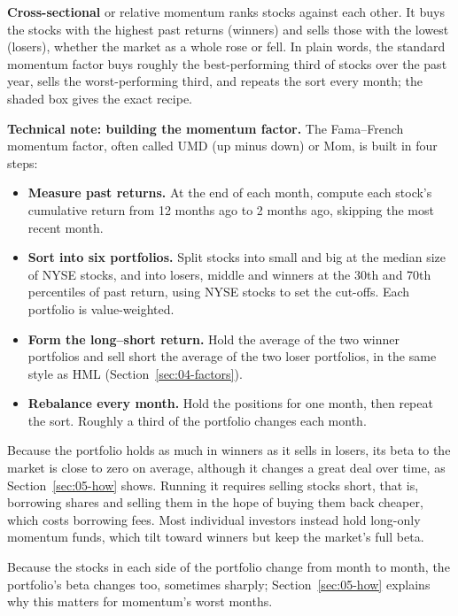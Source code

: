 \textbf{Cross-sectional} or relative momentum ranks stocks against each other. It buys the stocks with the highest past returns (winners) and sells those with the lowest (losers), whether the market as a whole rose or fell. In plain words, the standard momentum factor buys roughly the best-performing third of stocks over the past year, sells the worst-performing third, and repeats the sort every month; the shaded box gives the exact recipe.

\begin{technote}
\textbf{Technical note: building the momentum factor.} The Fama--French momentum factor, often called UMD (up minus down) or Mom, is built in four steps:

\begin{itemize}
  \item \textbf{Measure past returns.} At the end of each month, compute each stock's cumulative return from 12 months ago to 2 months ago, skipping the most recent month.
  \item \textbf{Sort into six portfolios.} Split stocks into small and big at the median size of NYSE stocks, and into losers, middle and winners at the 30th and 70th percentiles of past return, using NYSE stocks to set the cut-offs. Each portfolio is value-weighted.
  \item \textbf{Form the long--short return.} Hold the average of the two winner portfolios and sell short the average of the two loser portfolios, in the same style as HML (Section~\ref{sec:04-factors}).
  \item \textbf{Rebalance every month.} Hold the positions for one month, then repeat the sort. Roughly a third of the portfolio changes each month.
\end{itemize}
\end{technote}

Because the portfolio holds as much in winners as it sells in losers, its beta to the market is close to zero on average, although it changes a great deal over time, as Section~\ref{sec:05-how} shows. Running it requires selling stocks short, that is, borrowing shares and selling them in the hope of buying them back cheaper, which costs borrowing fees. Most individual investors instead hold long-only momentum funds, which tilt toward winners but keep the market's full beta.

Because the stocks in each side of the portfolio change from month to month, the portfolio's beta changes too, sometimes sharply; Section~\ref{sec:05-how} explains why this matters for momentum's worst months.

